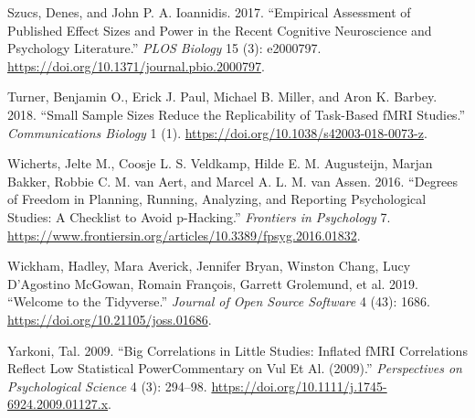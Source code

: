 \documentclass[
  letterpaper,
  DIV=11,
  numbers=noendperiod]{scrartcl}
\newlength{\cslhangindent}
\newenvironment{CSLReferences}[2] %
 {\begin{list}{}{%
  \setlength{\itemindent}{0pt}
  \setlength{\leftmargin}{0pt}
  \setlength{\parsep}{0pt}
  \ifodd #1
   \setlength{\leftmargin}{\cslhangindent}
   \setlength{\itemindent}{-1\cslhangindent}
  \fi
  \setlength{\itemsep}{#2\baselineskip}}}
 {\end{list}}
\begin{document}
\begin{CSLReferences}{1}{0}
Szucs, Denes, and John P. A. Ioannidis. 2017. {``Empirical Assessment of
Published Effect Sizes and Power in the Recent Cognitive Neuroscience
and Psychology Literature.''} \emph{PLOS Biology} 15 (3): e2000797.
\url{https://doi.org/10.1371/journal.pbio.2000797}.

Turner, Benjamin O., Erick J. Paul, Michael B. Miller, and Aron K.
Barbey. 2018. {``Small Sample Sizes Reduce the Replicability of
Task-Based fMRI Studies.''} \emph{Communications Biology} 1 (1).
\url{https://doi.org/10.1038/s42003-018-0073-z}.

Wicherts, Jelte M., Coosje L. S. Veldkamp, Hilde E. M. Augusteijn,
Marjan Bakker, Robbie C. M. van Aert, and Marcel A. L. M. van Assen.
2016. {``Degrees of Freedom in Planning, Running, Analyzing, and
Reporting Psychological Studies: A Checklist to Avoid p-Hacking.''}
\emph{Frontiers in Psychology} 7.
\url{https://www.frontiersin.org/articles/10.3389/fpsyg.2016.01832}.

Wickham, Hadley, Mara Averick, Jennifer Bryan, Winston Chang, Lucy
D'Agostino McGowan, Romain François, Garrett Grolemund, et al. 2019.
{``Welcome to the Tidyverse.''} \emph{Journal of Open Source Software} 4
(43): 1686. \url{https://doi.org/10.21105/joss.01686}.

Yarkoni, Tal. 2009. {``Big Correlations in Little Studies: Inflated fMRI
Correlations Reflect Low Statistical Power{\textemdash}Commentary on Vul
Et Al. (2009).''} \emph{Perspectives on Psychological Science} 4 (3):
294--98. \url{https://doi.org/10.1111/j.1745-6924.2009.01127.x}.

\end{CSLReferences}
\end{document}
